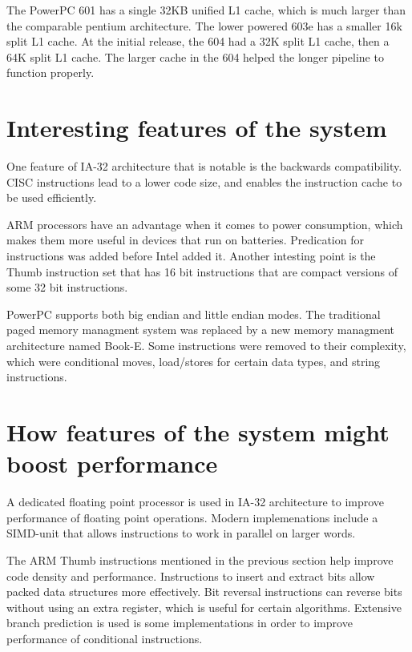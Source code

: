 \documentclass[letterpaper,10pt,titlepage,twocolumn]{article}
\begin{document}
The PowerPC 601 has a single 32KB unified L1 cache, which is much larger than the comparable pentium architecture.
The lower powered 603e has a smaller 16k split L1 cache.
At the initial release, the 604 had a 32K split L1 cache, then a 64K split L1 cache.
The larger cache in the 604 helped the longer pipeline to function properly.
\newline
\par

\section*{Interesting features of the system}

One feature of IA-32 architecture that is notable is the backwards compatibility.
CISC instructions lead to a lower code size, and enables the instruction cache to be used efficiently.
\newline
\par

ARM processors have an advantage when it comes to power consumption, which makes them more useful in devices that run on batteries.
Predication for instructions was added before Intel added it.
Another intesting point is the Thumb instruction set that has 16 bit instructions that are compact versions of some 32 bit instructions.
\newline
\par

PowerPC supports both big endian and little endian modes.
The traditional paged memory managment system was replaced by a new memory managment architecture named Book-E.
Some instructions were removed to their complexity, which were conditional moves, load/stores for certain data types, and string instructions.
\newline
\par

\section*{How features of the system might boost performance}

A dedicated floating point processor is used in IA-32 architecture to improve performance of floating point operations.
Modern implemenations include a SIMD-unit that allows instructions to work in parallel on larger words.
\newline
\par

The ARM Thumb instructions mentioned in the previous section help improve code density and performance.
Instructions to insert and extract bits allow packed data structures more effectively.
Bit reversal instructions can reverse bits without using an extra register, which is useful for certain algorithms.
Extensive branch prediction is used is some implementations in order to improve performance of conditional instructions.
\newline
\par
\end{document}
